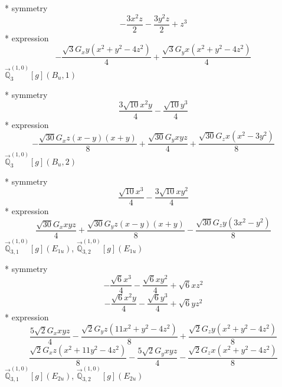 \documentclass[fleqn,8pt]{jsarticle}
\begin{document}
\noindent\quad ** symmetry
\begin{dmath*}
- \frac{3 x^{2} z}{2} - \frac{3 y^{2} z}{2} + z^{3}
\end{dmath*}
\noindent\quad ** expression
\begin{dmath*}
- \frac{\sqrt{3} G_{x} y \left(x^{2} + y^{2} - 4 z^{2}\right)}{4} + \frac{\sqrt{3} G_{y} x \left(x^{2} + y^{2} - 4 z^{2}\right)}{4}
\end{dmath*}
\noindent\quad $\vec{\mathbb{Q}}_{3}^{(1,0)}[g](B_{u},1)$

\noindent\quad ** symmetry
\begin{dmath*}
\frac{3 \sqrt{10} x^{2} y}{4} - \frac{\sqrt{10} y^{3}}{4}
\end{dmath*}
\noindent\quad ** expression
\begin{dmath*}
- \frac{\sqrt{30} G_{x} z \left(x - y\right) \left(x + y\right)}{8} + \frac{\sqrt{30} G_{y} x y z}{4} + \frac{\sqrt{30} G_{z} x \left(x^{2} - 3 y^{2}\right)}{8}
\end{dmath*}
\noindent\quad $\vec{\mathbb{Q}}_{3}^{(1,0)}[g](B_{u},2)$

\noindent\quad ** symmetry
\begin{dmath*}
\frac{\sqrt{10} x^{3}}{4} - \frac{3 \sqrt{10} x y^{2}}{4}
\end{dmath*}
\noindent\quad ** expression
\begin{dmath*}
\frac{\sqrt{30} G_{x} x y z}{4} + \frac{\sqrt{30} G_{y} z \left(x - y\right) \left(x + y\right)}{8} - \frac{\sqrt{30} G_{z} y \left(3 x^{2} - y^{2}\right)}{8}
\end{dmath*}
\noindent\quad $\vec{\mathbb{Q}}_{3,1}^{(1,0)}[g](E_{1u})$, $\vec{\mathbb{Q}}_{3,2}^{(1,0)}[g](E_{1u})$

\noindent\quad ** symmetry
\begin{dmath*}
- \frac{\sqrt{6} x^{3}}{4} - \frac{\sqrt{6} x y^{2}}{4} + \sqrt{6} x z^{2}
\end{dmath*}
\begin{dmath*}
- \frac{\sqrt{6} x^{2} y}{4} - \frac{\sqrt{6} y^{3}}{4} + \sqrt{6} y z^{2}
\end{dmath*}
\noindent\quad ** expression
\begin{dmath*}
\frac{5 \sqrt{2} G_{x} x y z}{4} - \frac{\sqrt{2} G_{y} z \left(11 x^{2} + y^{2} - 4 z^{2}\right)}{8} + \frac{\sqrt{2} G_{z} y \left(x^{2} + y^{2} - 4 z^{2}\right)}{8}
\end{dmath*}
\begin{dmath*}
\frac{\sqrt{2} G_{x} z \left(x^{2} + 11 y^{2} - 4 z^{2}\right)}{8} - \frac{5 \sqrt{2} G_{y} x y z}{4} - \frac{\sqrt{2} G_{z} x \left(x^{2} + y^{2} - 4 z^{2}\right)}{8}
\end{dmath*}
\noindent\quad $\vec{\mathbb{Q}}_{3,1}^{(1,0)}[g](E_{2u})$, $\vec{\mathbb{Q}}_{3,2}^{(1,0)}[g](E_{2u})$
\end{document}
